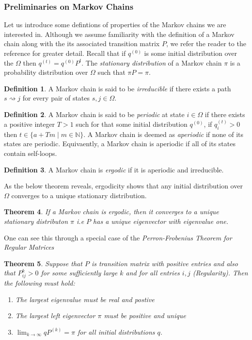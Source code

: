 \documentclass[12pt]{amsart}
\newtheorem{theorem}{Theorem}[section]
\theoremstyle{definition}
\newtheorem{definition}[theorem]{Definition}
\theoremstyle{remark}
\numberwithin{equation}{section}
\theoremstyle{remark}
\begin{document}
\subsubsection{Preliminaries on Markov Chains}
Let us introduce some defintions of properties of the Markov chains we are interested in. Although we assume familiarity with the definition of a Markov chain along with the its associated transition matrix $P$, we refer the reader to the reference \cite{cover} for greater detail. Recall that if $q^{(0)}$ is some initial  distribution over the $\Omega$ then $q^{(t)} = q^{(0)}P^t$. The \emph{stationary distribution} of a Markov chain $\pi$ is a probability distribution over $\Omega$ such that $\pi P = \pi$.
%
\begin{definition}
  A Markov chain is said to be \emph{irreducible} if there exists a path $s \rightsquigarrow j$ for every pair of states $s,j \in \Omega$.
\end{definition}
%
\begin{definition}
  A Markov chain is said to be \emph{periodic} at state $i \in \Omega$ if there exists a positive integer $T > 1$ such for that some initial distribution $q^(0)$, if $q_i^{(t)} > 0$ then $t \in \{a + Tm \mid m \in \mathbb{N}\}$. A Markov chain is deemed as \emph{aperiodic} if none of its states are periodic. Equivaently, a Markov chain is aperiodic if all of its states contain self-loops.
\end{definition}
%
\begin{definition}
  A Markov chain is \emph{ergodic} if it is aperiodic and irreducible.
\end{definition}
\noindent As the below theorem reveals, ergodicity shows that any initial distribution over $\Omega$ converges to a unique stationary distribution.
%
\begin{theorem}
  If a Markov chain is ergodic, then it converges to a unique stationary distributon $\pi$ i.e $P$ has a unique eigenvector with eigenvalue one.
\end{theorem}
%
\noindent One can see this through a special case of the \emph{Perron-Frobenius Theorem for Regular Matrices}
%
\begin{theorem}
  Suppose that $P$ is transition matrix with positive entries and also that $P_{ij}^{k} > 0$ for some sufficiently large $k$ and for all entries $i,j$ (Regularity). Then the following must hold:
  \begin{enumerate}
    \item The largest eigenvalue must be real and postive
    \item The largest left eigenvector $\pi$ must be positive and unique
    \item $\lim_{k \rightarrow \infty} qP^{(k)} = \pi$ for all initial distributions $q$.
  \end{enumerate}
\end{theorem}
\end{document}
